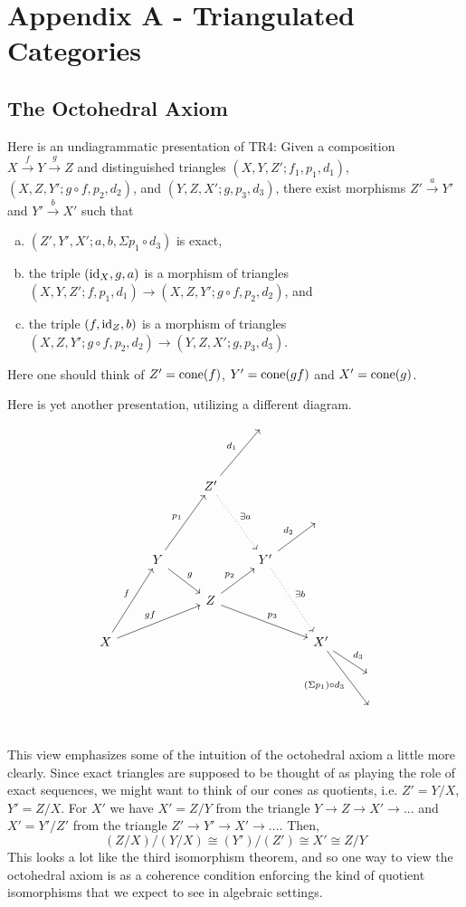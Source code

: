 \documentclass[11pt]{article}
\begin{document}
\newpage


\section{Appendix A - Triangulated Categories}
\subsection{The Octohedral Axiom}\label{octaxiom}
Here is an undiagrammatic presentation of TR4: Given a composition $X \xrightarrow{f} Y \xrightarrow{g} Z$ and distinguished triangles $(X,Y,Z'; f_1, p_1, d_1)$, $(X,Z,Y'; g\circ f, p_2, d_2)$, and $(Y,Z,X'; g, p_3, d_3)$, there exist morphisms $Z' \xrightarrow{a} Y'$ and $Y' \xrightarrow{b} X'$ such that
	\begin{enumerate}[(a)]
		\item $(Z',Y',X'; a,b,\Sigma p_1 \circ d_3)$ is exact,
		\item the triple $(\operatorname{id}_X,g,a)$ is a morphism of triangles $(X,Y,Z'; f,p_1,d_1) \to (X,Z,Y'; g\circ f,p_2,d_2)$, and
		\item the triple $(f,\operatorname{id}_Z,b)$ is a morphism of triangles $(X,Z,Y'; g\circ f, p_2, d_2) \to (Y,Z,X'; g, p_3, d_3)$.
	\end{enumerate}
	Here one should think of $Z' = \operatorname{cone}(f)$, $Y' = \operatorname{cone}(gf)$ and $X' = \operatorname{cone}(g)$.

Here is yet another presentation, utilizing a different diagram. 
\[\begin{tikzcd}
  &   &   & {} & &  \\
  &   &   &   &   &  \\
  &   & Z' \ar[ruu,"d_1"]\ar[ddr,"\exists a",dotted] &   &  &  \\
  &   &   &   & {}  &  \\
  & Y\ar[rd,"g"] \ar[ruu,"p_1"] &   & Y'\ar[ru,"d_2"] \ar[rdd,"\exists b", dotted]&   &  \\
  &   & Z \ar[ru,"p_2"] \ar[drr,"p_3"] &   &   &  \\
X \ar[ruu,"f"]  \ar[urr,"gf"]&   &   &   & X' \ar[rd,"d_3"] \ar[rdd,"(\Sigma p_1) \circ d_3"'] &  \\
  &   &   &   &   & {} \\
  &   &   &   &   & {} \\
\end{tikzcd}\]
This view emphasizes some of the intuition of the octohedral axiom a little more clearly. Since exact triangles are supposed to be thought of as playing the role of exact sequences, we might want to think of our cones as quotients, i.e. $Z' = Y/X$, $Y' = Z/X$. For $X'$ we have $X' = Z/Y$ from the triangle $Y \to Z \to X' \to ... $ and $X' = Y'/Z'$ from the triangle $Z' \to Y' \to X' \to ...$. Then, 
\[
	(Z/X)/(Y/X) \cong (Y')/(Z') \cong X' \cong Z/Y
\]
This looks a lot like the third isomorphism theorem, and so one way to view the octohedral axiom is as a coherence condition enforcing the kind of quotient isomorphisms that we expect to see in algebraic settings.
\end{document}
